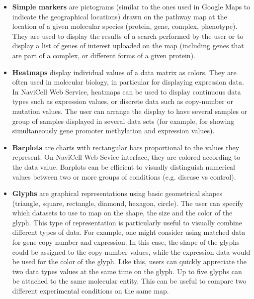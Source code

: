 \documentclass[a4,center,fleqn]{NAR}
\begin{document}
\begin{itemize}

\item \textbf{Simple markers} are pictograms (similar to the ones used in Google Maps
to indicate the geographical locations) drawn on the pathway map at the location
of a given molecular species (protein, gene, complex, phenotype). They are used to display the
results of a search performed by the user or to display a list of genes of interest
uploaded on the map (including genes that are part of a complex, or different forms of a given protein).

\item \textbf{Heatmaps} display individual values of a data matrix as
colors. They are often used in molecular biology, in particular for displaying expression
data. In NaviCell Web Service, heatmaps can be used to
display continuous data types such as expression values, or discrete data such
as copy-number or mutation values. The user can arrange the display to have
several samples or group of samples displayed in several data sets
(for example, for showing simultaneously gene promoter methylation and expression values).

\item \textbf{Barplots} are charts with rectangular bars proportional to the values
they represent. On NaviCell Web Sevice interface, they are colored according to the
data value. Barplots can be efficient to visually distinguish numerical
values between two or more groups of conditions (e.g. disease vs control).

\item \textbf{Glyphs} are graphical representations using basic geometrical
shapes (triangle, square, rectangle, diamond, hexagon, circle). The user can specify
which datasets to use to map on the shape, the size and the color of the glyph. This
type of representation is particularly useful to visually combine different
types of data. For example, one might consider using matched data for
gene copy number and expression. In this case, the shape of the
glyphs could be assigned to the copy-number values, while the expression data
would be used for the color of the glyph. Like this, users can quickly
appreciate the two data types values at the same time on the glyph.
Up to five glyphs can be attached to the same molecular entity.
This can be useful to compare two different experimental conditions on the same
map.


\end{itemize}
\end{document}
